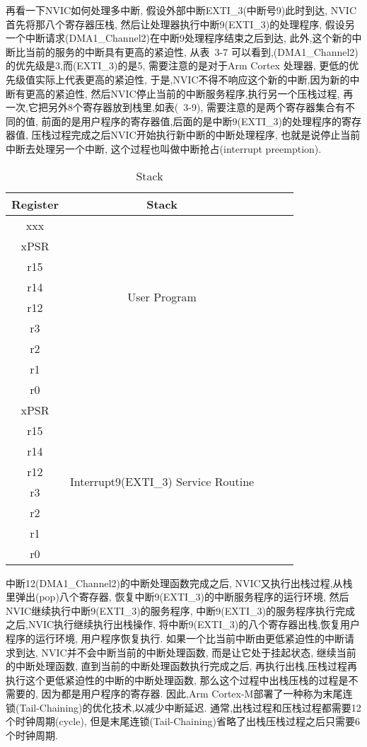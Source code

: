 再看一下NVIC如何处理多中断,
假设外部中断EXTI\_3(中断号9)此时到达,
NVIC首先将那八个寄存器压栈,
然后让处理器执行中断9(EXTI\_3)的处理程序,
假设另一个中断请求(DMA1\_Channel2)在中断9处理程序结束之后到达,
此外,这个新的中断比当前的服务的中断具有更高的紧迫性,
从表~3-7 可以看到,(DMA1\_Channel2) 的优先级是3,而(EXTI\_3)的是5,
需要注意的是对于Arm Cortex 处理器,
更低的优先级值实际上代表更高的紧迫性,
于是,NVIC不得不响应这个新的中断,因为新的中断有更高的紧迫性,
然后NVIC停止当前的中断服务程序,执行另一个压栈过程,
再一次,它把另外8个寄存器放到栈里,如表(~3-9),
需要注意的是两个寄存器集合有不同的值,
前面的是用户程序的寄存器值,后面的是中断9(EXTI\_3)的处理程序的寄存器值,
压栈过程完成之后NVIC开始执行新中断的中断处理程序,
也就是说停止当前中断去处理另一个中断,
这个过程也叫做中断抢占(interrupt preemption).
\begin{table}[htbp]
    \caption{  Stack }\label{tab:table1}
    \vspace{0.5em}\centering\wuhao
    \begin{tabular}{ccccc}
    \toprule[1.5pt]
    Register & Stack  \\
    \midrule[1pt]
    xxx &   \multirow{8}{*}{User Program} \\ \hline
    xPSR &    \\ 
    r15 &     \\
    r14 &     \\
    r12 &     \\
    r3 &      \\
    r2 &     \\
    r1 &      \\
    r0 &    \\
    \cline{1-2}
    xPSR &  \multirow{8}{*}{Interrupt9(EXTI\_3) Service  Routine} \\
    r15 &   \\
    r14 &   \\
    r12 &   \\
    r3 &    \\
    r2 &   \\
    r1 &    \\
    r0 &     \\
    \bottomrule[1.5pt]
    \end{tabular}
    \vspace{\baselineskip}
    \end{table}

中断12(DMA1\_Channel2)的中断处理函数完成之后,
NVIC又执行出栈过程,从栈里弹出(pop)八个寄存器,
恢复中断9(EXTI\_3)的中断服务程序的运行环境,
然后NVIC继续执行中断9(EXTI\_3)的服务程序,
中断9(EXTI\_3)的服务程序执行完成之后,NVIC执行继续执行出栈操作,
将中断9(EXTI\_3)的八个寄存器出栈,恢复用户程序的运行环境,
用户程序恢复执行.
如果一个比当前中断由更低紧迫性的中断请求到达,
NVIC并不会中断当前的中断处理函数,
而是让它处于挂起状态,
继续当前的中断处理函数,
直到当前的中断处理函数执行完成之后,
再执行出栈,压栈过程再执行这个更低紧迫性的中断的中断处理函数,
那么这个过程中出栈压栈的过程是不需要的,
因为都是用户程序的寄存器.
因此,Arm Cortex-M部署了一种称为末尾连锁(Tail-Chaining)的优化技术,以减少中断延迟.
通常,出栈过程和压栈过程都需要12个时钟周期(cycle),
但是末尾连锁(Tail-Chaining)省略了出栈压栈过程之后只需要6个时钟周期.

